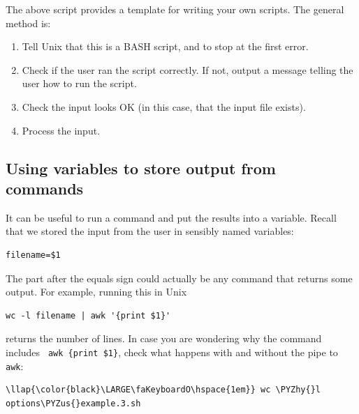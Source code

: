 \documentclass[11pt]{article}
\providecommand{\tightlist}{%
      \setlength{\itemsep}{0pt}\setlength{\parskip}{0pt}}
\def\PYZus{\char`\_}
\def\PYZhy{\char`\-}
\begin{document}
\newpage



The above script provides a template for writing your own scripts. The
general method is:

\begin{enumerate}
\def\labelenumi{\arabic{enumi}.}
\tightlist
\item
  Tell Unix that this is a BASH script, and to stop at the first error.
\item
  Check if the user ran the script correctly. If not, output a message
  telling the user how to run the script.
\item
  Check the input looks OK (in this case, that the input file exists).
\item
  Process the input.
\end{enumerate}

\hypertarget{using-variables-to-store-output-from-commands}{%
\subsection{Using variables to store output from
commands}\label{using-variables-to-store-output-from-commands}}

It can be useful to run a command and put the results into a variable.
Recall that we stored the input from the user in sensibly named
variables:

\begin{verbatim}
filename=$1
\end{verbatim}

The part after the equals sign could actually be any command that
returns some output. For example, running this in Unix

\begin{verbatim}
wc -l filename | awk '{print $1}'
\end{verbatim}

returns the number of lines. In case you are wondering why the command
includes
\texttt{\textbar{}\ awk\ \textquotesingle{}\{print\ \$1\}\textquotesingle{}},
check what happens with and without the pipe to \texttt{awk}:

\begin{terminalinput}
\begin{Verbatim}[commandchars=\\\{\}]
\llap{\color{black}\LARGE\faKeyboardO\hspace{1em}} wc \PYZhy{}l options\PYZus{}example.3.sh
\end{Verbatim}
\end{terminalinput}
\end{document}

